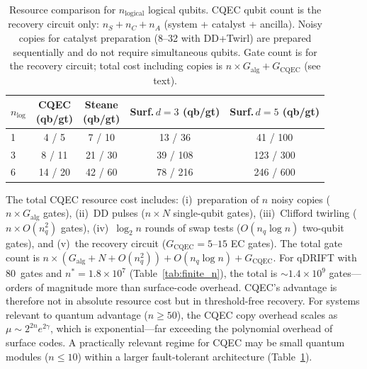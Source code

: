 \documentclass[a4paper,twocolumn]{quantumarticle}
\newenvironment{ruledtabular}{}{}%
\providecommand{\colrule}{\hline}
\begin{document}
\begin{table}[!tbp]
\caption{Resource comparison for $n_\mathrm{logical}$ logical qubits. CQEC qubit count is the recovery circuit only: $n_S + n_C + n_A$ (system + catalyst + ancilla). Noisy copies for catalyst preparation (8--32 with DD+Twirl) are prepared sequentially and do not require simultaneous qubits. Gate count is for the recovery circuit; total cost including copies is $n \times G_\mathrm{alg} + G_\mathrm{CQEC}$ (see text).}
\label{tab:resources}
\centering\scriptsize
\setlength{\tabcolsep}{3pt}
\begin{ruledtabular}
\begin{tabular}{lcccc}
$n_\mathrm{log}$ & \makecell{CQEC\\(qb/gt)} & \makecell{Steane\\(qb/gt)} & \makecell{Surf.\,$d{=}3$\\(qb/gt)} & \makecell{Surf.\,$d{=}5$\\(qb/gt)} \\
\colrule
1 & 4 / 5 & 7 / 10 & 13 / 36 & 41 / 100 \\
3 & 8 / 11 & 21 / 30 & 39 / 108 & 123 / 300 \\
6 & 14 / 20 & 42 / 60 & 78 / 216 & 246 / 600 \\
\end{tabular}
\end{ruledtabular}
\end{table}

The total CQEC resource cost includes: (i)~preparation of $n$ noisy copies ($n \times G_\mathrm{alg}$ gates), (ii)~DD pulses ($n \times N$ single-qubit gates), (iii)~Clifford twirling ($n \times O(n_q^2)$ gates), (iv)~$\log_2 n$ rounds of swap tests ($O(n_q \log n)$ two-qubit gates), and (v)~the recovery circuit ($G_\mathrm{CQEC} = 5$--$15$ EC gates).
The total gate count is $n \times (G_\mathrm{alg} + N + O(n_q^2)) + O(n_q \log n) + G_\mathrm{CQEC}$.
For qDRIFT with 80~gates and $n^* = 1.8 \times 10^7$ (Table~\ref{tab:finite_n}), the total is $\sim 1.4 \times 10^9$ gates---orders of magnitude more than surface-code overhead.
CQEC's advantage is therefore not in absolute resource cost but in threshold-free recovery.
For systems relevant to quantum advantage ($n \geq 50$), the CQEC copy overhead scales as $\mu \sim 2^{2n} e^{2\gamma}$, which is exponential---far exceeding the polynomial overhead of surface codes.
A practically relevant regime for CQEC may be small quantum modules ($n \leq 10$) within a larger fault-tolerant architecture (Table~\ref{tab:resources}).
\end{document}
